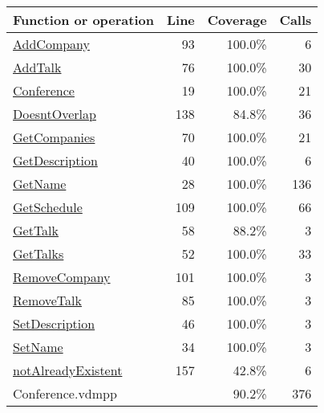 \begin{longtable}{|l|r|r|r|}
\hline
Function or operation & Line & Coverage & Calls \\
\hline
\hline
\hyperref[AddCompany:93]{AddCompany} & 93&100.0\% & 6 \\
\hline
\hyperref[AddTalk:76]{AddTalk} & 76&100.0\% & 30 \\
\hline
\hyperref[Conference:19]{Conference} & 19&100.0\% & 21 \\
\hline
\hyperref[DoesntOverlap:138]{DoesntOverlap} & 138&84.8\% & 36 \\
\hline
\hyperref[GetCompanies:70]{GetCompanies} & 70&100.0\% & 21 \\
\hline
\hyperref[GetDescription:40]{GetDescription} & 40&100.0\% & 6 \\
\hline
\hyperref[GetName:28]{GetName} & 28&100.0\% & 136 \\
\hline
\hyperref[GetSchedule:109]{GetSchedule} & 109&100.0\% & 66 \\
\hline
\hyperref[GetTalk:58]{GetTalk} & 58&88.2\% & 3 \\
\hline
\hyperref[GetTalks:52]{GetTalks} & 52&100.0\% & 33 \\
\hline
\hyperref[RemoveCompany:101]{RemoveCompany} & 101&100.0\% & 3 \\
\hline
\hyperref[RemoveTalk:85]{RemoveTalk} & 85&100.0\% & 3 \\
\hline
\hyperref[SetDescription:46]{SetDescription} & 46&100.0\% & 3 \\
\hline
\hyperref[SetName:34]{SetName} & 34&100.0\% & 3 \\
\hline
\hyperref[notAlreadyExistent:157]{notAlreadyExistent} & 157&42.8\% & 6 \\
\hline
\hline
Conference.vdmpp & & 90.2\% & 376 \\
\hline
\end{longtable}

